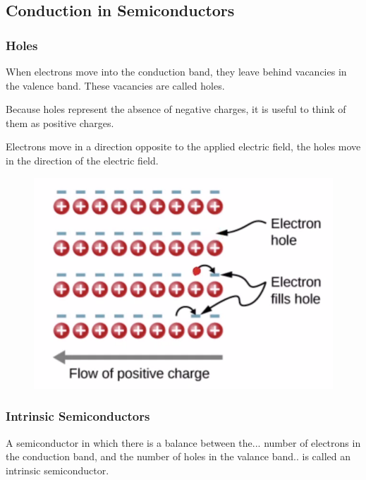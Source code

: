 \documentclass[class=article,crop=false]{standalone}
\begin{document}
\subsection{Conduction in Semiconductors}
\subsubsection{Holes}
When electrons move into the conduction band, they leave behind vacancies in the valence band. These vacancies are called holes.

Because holes represent the absence of negative charges, it is useful to think of them as positive charges.

Electrons move in a direction opposite to the applied electric field, the holes move in the direction of the electric field.

\begin{figure}[h!]
	\centering
	\includegraphics[width=.8\linewidth]{./Images/holes.png}
	\caption{}
\end{figure}

\subsubsection{Intrinsic Semiconductors}

A semiconductor in which there is a balance between the... number of electrons in the conduction band, and the number of holes in the valance band..  is called an intrinsic semiconductor.
\end{document}
